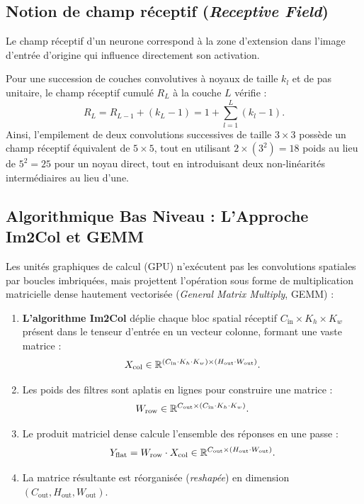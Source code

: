 \subsection{Notion de champ réceptif (\emph{Receptive Field})}

Le champ réceptif d'un neurone correspond à la zone d'extension dans l'image d'entrée d'origine qui influence directement son activation.
\begin{proposition}
    Pour une succession de couches convolutives à noyaux de taille $k_l$ et de pas unitaire, le champ réceptif cumulé $R_L$ à la couche $L$ vérifie :
    \begin{equation}
        R_L = R_{L-1} + (k_L - 1) = 1 + \sum_{l=1}^L (k_l - 1).
    \end{equation}
    Ainsi, l'empilement de deux convolutions successives de taille $3 \times 3$ possède un champ réceptif équivalent de $5 \times 5$, tout en utilisant $2 \times (3^2) = 18$ poids au lieu de $5^2 = 25$ pour un noyau direct, tout en introduisant deux non-linéarités intermédiaires au lieu d'une.
\end{proposition}

\subsection{Algorithmique Bas Niveau : L'Approche Im2Col et GEMM}

Les unités graphiques de calcul (GPU) n'exécutent pas les convolutions spatiales par boucles imbriquées, mais projettent l'opération sous forme de multiplication matricielle dense hautement vectorisée (\emph{General Matrix Multiply}, GEMM) :

\begin{enumerate}
    \item \textbf{L'algorithme Im2Col} déplie chaque bloc spatial réceptif $C_{\mathrm{in}} \times K_h \times K_w$ présent dans le tenseur d'entrée en un vecteur colonne, formant une vaste matrice :
    \begin{equation}
        X_{\mathrm{col}} \in \mathbb{R}^{(C_{\mathrm{in}} \cdot K_h \cdot K_w) \times (H_{\mathrm{out}} \cdot W_{\mathrm{out}})}.
    \end{equation}
    \item Les poids des filtres sont aplatis en lignes pour construire une matrice :
    \begin{equation}
        W_{\mathrm{row}} \in \mathbb{R}^{C_{\mathrm{out}} \times (C_{\mathrm{in}} \cdot K_h \cdot K_w)}.
    \end{equation}
    \item Le produit matriciel dense calcule l'ensemble des réponses en une passe :
    \begin{equation}
        Y_{\mathrm{flat}} = W_{\mathrm{row}} \cdot X_{\mathrm{col}} \in \mathbb{R}^{C_{\mathrm{out}} \times (H_{\mathrm{out}} \cdot W_{\mathrm{out}})}.
    \end{equation}
    \item La matrice résultante est réorganisée (\emph{reshapée}) en dimension $(C_{\mathrm{out}}, H_{\mathrm{out}}, W_{\mathrm{out}})$.
\end{enumerate}

